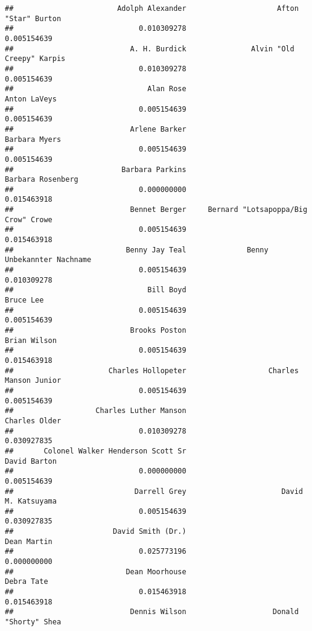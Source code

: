 \documentclass[
]{article}
\begin{document}
\begin{verbatim}
##                        Adolph Alexander                     Afton "Star" Burton 
##                             0.010309278                             0.005154639 
##                           A. H. Burdick               Alvin "Old Creepy" Karpis 
##                             0.010309278                             0.005154639 
##                               Alan Rose                            Anton LaVeys 
##                             0.005154639                             0.005154639 
##                           Arlene Barker                           Barbara Myers 
##                             0.005154639                             0.005154639 
##                         Barbara Parkins                       Barbara Rosenberg 
##                             0.000000000                             0.015463918 
##                           Bennet Berger     Bernard "Lotsapoppa/Big Crow" Crowe 
##                             0.005154639                             0.015463918 
##                          Benny Jay Teal              Benny Unbekannter Nachname 
##                             0.005154639                             0.010309278 
##                               Bill Boyd                               Bruce Lee 
##                             0.005154639                             0.005154639 
##                           Brooks Poston                            Brian Wilson 
##                             0.005154639                             0.015463918 
##                      Charles Hollopeter                   Charles Manson Junior 
##                             0.005154639                             0.005154639 
##                   Charles Luther Manson                           Charles Older 
##                             0.010309278                             0.030927835 
##       Colonel Walker Henderson Scott Sr                            David Barton 
##                             0.000000000                             0.005154639 
##                            Darrell Grey                      David M. Katsuyama 
##                             0.005154639                             0.030927835 
##                       David Smith (Dr.)                             Dean Martin 
##                             0.025773196                             0.000000000 
##                          Dean Moorhouse                              Debra Tate 
##                             0.015463918                             0.015463918 
##                           Dennis Wilson                    Donald "Shorty" Shea 

\end{verbatim}
\end{document}
